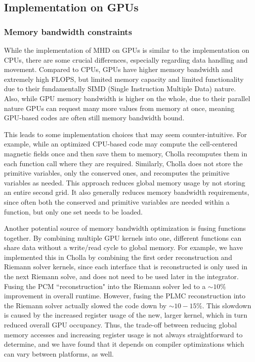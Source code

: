 \documentclass[modern]{aastex631}
\begin{document}
\subsection{Implementation on GPUs}
\label{sec:gpu-vs-cpu}

\subsubsection{Memory bandwidth constraints}
While the implementation of MHD on GPUs is similar to the implementation on CPUs, there are some crucial differences, especially regarding data handling and movement. Compared to CPUs, GPUs have higher memory bandwidth and extremely high FLOPS, but limited memory capacity and limited functionality due to their fundamentally SIMD (Single Instruction Multiple Data) nature. Also, while GPU memory bandwidth is higher on the whole, due to their parallel nature GPUs can request many more values from memory at once, meaning GPU-based codes are often still memory bandwidth bound.

This leads to some implementation choices that may seem counter-intuitive. For example, while an optimized CPU-based code may compute the cell-centered magnetic fields once and then save them to memory, Cholla recomputes them in each function call where they are required. Similarly, Cholla does not store the primitive variables, only the conserved ones, and recomputes the primitive variables as needed. This approach reduces global memory usage by not storing an entire second grid. It also generally reduces memory bandwidth requirements, since often both the conserved and primitive variables are needed within a function, but only one set needs to be loaded.

Another potential source of memory bandwidth optimization is fusing functions together. By combining multiple GPU kernels into one, different functions can share data without a write/read cycle to global memory. For example, we have implemented this in Cholla by combining the first order reconstruction and Riemann solver kernels, since each interface that is reconstructed is only used in the next Riemann solve, and does not need to be used later in the integrator. Fusing the PCM ``reconstruction" into the Riemann solver led to a $\sim 10\%$ improvement in overall runtime. However, fusing the PLMC reconstruction into the Riemann solver actually slowed the code down by $\sim 10-15\%$. This slowdown is caused by the increased register usage of the new, larger kernel, which in turn reduced overall GPU occupancy. Thus, the trade-off between reducing global memory accesses and increasing register usage is not always straightforward to determine, and we have found that it depends on compiler optimizations which can vary between platforms, as well.
\end{document}
